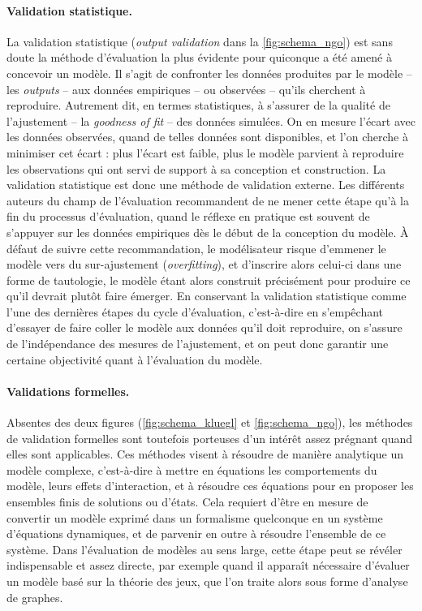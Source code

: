 \paragraph{Validation statistique.}
La validation statistique (\og \textit{output validation}\fg{} dans la \cref{fig:schema_ngo}) est sans doute la méthode d'évaluation la plus évidente pour quiconque a été amené à concevoir un modèle.
Il s'agit de confronter les données produites par le modèle -- les \textit{outputs} --
aux données empiriques -- ou observées -- qu'ils cherchent à reproduire.
Autrement dit, en termes statistiques, à s'assurer de la qualité de l'ajustement -- la \textit{goodness of fit} -- des données simulées.
On en mesure l'écart avec les données observées, quand de telles données sont disponibles, et l'on cherche à minimiser cet écart :
	plus l'écart est faible, plus le modèle parvient à reproduire les observations qui ont servi de support à sa conception et construction.
La validation statistique est donc une méthode de validation externe.
Les différents auteurs du champ de l'évaluation recommandent de ne mener cette étape qu'à la fin du processus d'évaluation, quand le réflexe en pratique est souvent de s'appuyer sur les données empiriques dès le début de la conception du modèle.
À défaut de suivre cette recommandation, le modélisateur risque d'emmener le modèle vers du \og sur-ajustement \fg{} (\textit{overfitting}), et d'inscrire alors celui-ci dans une forme de tautologie, le modèle étant alors construit précisément pour produire ce qu'il devrait plutôt faire émerger.
En conservant la validation statistique comme l'une des dernières étapes du cycle d'évaluation, c'est-à-dire en s'empêchant d'essayer de faire coller le modèle aux données qu'il doit reproduire, on s'assure de l'indépendance des mesures de l'ajustement, et on peut donc garantir une certaine objectivité quant à l'évaluation du modèle.

\paragraph{Validations formelles.}
Absentes des deux figures (\ref{fig:schema_kluegl} et \ref{fig:schema_ngo}), les méthodes de validation formelles sont toutefois porteuses d'un intérêt assez prégnant quand elles sont applicables.
Ces méthodes visent à résoudre de manière analytique un modèle complexe, c'est-à-dire à mettre en équations les comportements du modèle, leurs effets d'interaction, et à résoudre ces équations pour en proposer les ensembles finis de solutions ou d'états.
Cela requiert d'être en mesure de convertir un modèle exprimé dans un formalisme quelconque en un système d'équations dynamiques, et de parvenir en outre à résoudre l'ensemble de ce système.
Dans l'évaluation de modèles au sens large, cette étape peut se révéler indispensable et assez directe, par exemple quand il apparaît nécessaire d'évaluer un modèle basé sur la théorie des jeux, que l'on traite alors sous forme d'analyse de graphes.

